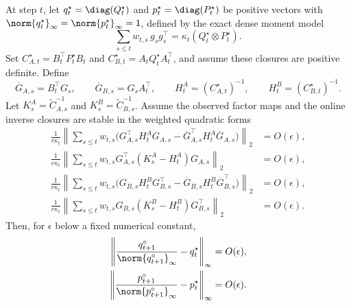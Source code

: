 \begin{proposition}
\label{prop:online-stationary-w1}
At step $t$, let
$q^\star_t=\diag(Q^\star_t)$ and
$p^\star_t=\diag(P^\star_t)$ be positive vectors with
$\norm{q^\star_t}_\infty=\norm{p^\star_t}_\infty=1$, defined by the exact
dense moment model
\[
  \sum_{s\le t}w_{t,s}\,g_sg_s^\top
  =
  \kappa_t(Q^\star_t\otimes P^\star_t).
\]
Set
$C^\star_{A,t}=B_t^\top P^\star_tB_t$ and
$C^\star_{B,t}=A_tQ^\star_tA_t^\top$, and assume these closures are
positive definite. Define
\[
  \overline G_{A,s}=B_t^\top G_s,\qquad
  \overline G_{B,s}=G_sA_t^\top,\qquad
  H^A_t=(C^\star_{A,t})^{-1},\qquad
  H^B_t=(C^\star_{B,t})^{-1}.
\]
Let $K^A_s=\widetilde C_{A,s}^{-1}$ and
$K^B_s=\widetilde C_{B,s}^{-1}$. Assume the observed factor maps and the
online inverse closures are stable in the weighted quadratic forms
\[
\begin{aligned}
  \frac{1}{r\kappa_t}
  \left\|
    \sum_{s\le t}w_{t,s}
    \bigl(
      G_{A,s}^\top H^A_tG_{A,s}
      -\overline G_{A,s}^\top H^A_t\overline G_{A,s}
    \bigr)
  \right\|_2
  &=
  O(\epsilon),
  \\
  \frac{1}{r\kappa_t}
  \left\|
    \sum_{s\le t}w_{t,s}
    G_{A,s}^\top(K^A_s-H^A_t)G_{A,s}
  \right\|_2
  &=
  O(\epsilon),
  \\
  \frac{1}{r\kappa_t}
  \left\|
    \sum_{s\le t}w_{t,s}
    \bigl(
      G_{B,s}H^B_tG_{B,s}^\top
      -\overline G_{B,s}H^B_t\overline G_{B,s}^\top
    \bigr)
  \right\|_2
  &=
  O(\epsilon),
  \\
  \frac{1}{r\kappa_t}
  \left\|
    \sum_{s\le t}w_{t,s}
    G_{B,s}(K^B_s-H^B_t)G_{B,s}^\top
  \right\|_2
  &=
  O(\epsilon).
\end{aligned}
\]
Then, for $\epsilon$ below a fixed numerical constant,
\[
\begin{aligned}
  \left\|
    \frac{q^\circ_{t+1}}{\norm{q^\circ_{t+1}}_\infty}
    -
    q^\star_t
  \right\|_\infty
  &=
  O(\epsilon),
  \\
  \left\|
    \frac{p^\circ_{t+1}}{\norm{p^\circ_{t+1}}_\infty}
    -
    p^\star_t
  \right\|_\infty
  &=
  O(\epsilon).
\end{aligned}
\]
\end{proposition}

